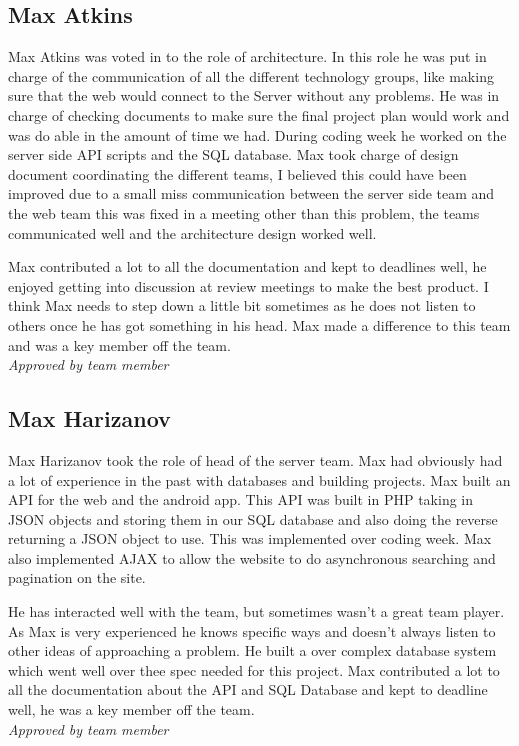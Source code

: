 \subsection{Max Atkins}
    Max Atkins was voted in to the role of architecture. In this role he was put in charge of the communication of all the different technology groups, like making sure that the web would connect to the Server without any problems. He was in charge of checking documents to make sure the final project plan would work and was do able in the amount of time we had. During coding week he worked on the server side API scripts and the SQL database. Max took charge of design document coordinating the different teams, I believed this could have been improved due to a small miss communication between the server side team and the web team this was fixed in a meeting other than this problem, the teams communicated well and the architecture design worked well.

    Max contributed a lot to all the documentation and kept to deadlines well, he enjoyed getting into discussion at review meetings to make the best product. I think Max needs to step down a little bit sometimes as he does not listen to others once he has got something in his head. Max made a difference to this team and was a key member off the team.\\
    \emph{Approved by team member}

\subsection{Max Harizanov}
    Max Harizanov took the role of head of the server team. Max had obviously had a lot of experience in the past with databases and building projects. Max built an API for the web and the android app. This API was built in PHP taking in JSON objects and storing them in our SQL database and also doing the reverse returning a JSON object to use. This was implemented over coding week.  Max also implemented AJAX to allow the website to do asynchronous searching and pagination on the site. 

    He has interacted well with the team, but sometimes wasn't a great team player. As Max is very experienced he knows specific ways and doesn't always listen to other ideas of approaching a problem. He built a over complex database system which went well over thee spec needed for this project. Max contributed a lot to all the documentation about the API and SQL Database and kept to deadline well, he was a key member off the team.\\
    \emph{Approved by team member}

